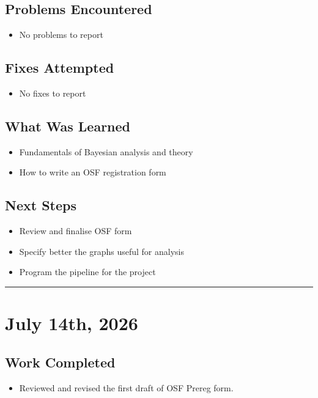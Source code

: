 \documentclass[11pt,a4paper]{article}
\newcommand{\entryseparator}{
  \vspace{1em} \noindent\rule{\textwidth}{0.4pt}
  \vspace*{-\baselineskip} 
}
\begin{document}
\subsection{Problems Encountered}

\begin{itemize}
    \item No problems to report
\end{itemize}

\subsection{Fixes Attempted}

\begin{itemize}
    \item No fixes to report
\end{itemize}

\subsection{What Was Learned}

\begin{itemize}
    \item Fundamentals of Bayesian analysis and theory 
    \item How to write an OSF registration form 
\end{itemize}

\subsection{Next Steps}

\begin{itemize}
    \item Review and finalise OSF form
    \item Specify better the graphs useful for analysis
    \item Program the pipeline for the project 
\end{itemize}
\entryseparator


\section{July 14th, 2026}

\subsection{Work Completed}

\begin{itemize}
    \item Reviewed and revised the first draft of OSF Prereg form.
\end{itemize}
\end{document}
